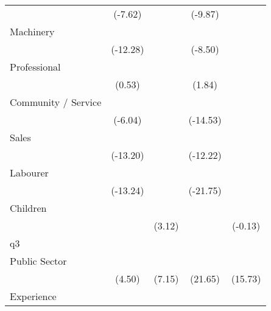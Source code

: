 {\begin{tabular}{l*{4}{c}}
                    &     (-7.62)         &                     &     (-9.87)         &                     \\
[1em]
Machinery           &            \sym{***}&                     &            \sym{***}&                     \\
                    &    (-12.28)         &                     &     (-8.50)         &                     \\
[1em]
Professional        &                     &                     &                     &                     \\
                    &      (0.53)         &                     &      (1.84)         &                     \\
[1em]
Community / Service &            \sym{***}&                     &            \sym{***}&                     \\
                    &     (-6.04)         &                     &    (-14.53)         &                     \\
[1em]
Sales               &            \sym{***}&                     &            \sym{***}&                     \\
                    &    (-13.20)         &                     &    (-12.22)         &                     \\
[1em]
Labourer            &            \sym{***}&                     &            \sym{***}&                     \\
                    &    (-13.24)         &                     &    (-21.75)         &                     \\
[1em]
Children            &                     &            \sym{**} &                     &                     \\
                    &                     &      (3.12)         &                     &     (-0.13)         \\
\hline
q3                  &                     &                     &                     &                     \\
Public Sector       &            \sym{***}&            \sym{***}&            \sym{***}&            \sym{***}\\
                    &      (4.50)         &      (7.15)         &     (21.65)         &     (15.73)         \\
[1em]
Experience          &            \sym{***}&            \sym{***}&            \sym{***}&            \sym{***}\\

\end{tabular}}
